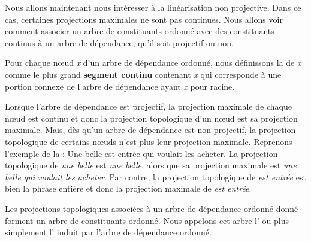 Nous allons maintenant nous intéresser à la linéarisation non projective. Dans ce cas, certaines projections maximales ne sont pas continues. Nous allons voir comment associer un arbre de constituants ordonné avec des constituants continus à un arbre de dépendance, qu’il soit projectif ou non.

\begin{styleLivreImportant}
Pour chaque nœud \textit{x} d’un arbre de dépendance ordonné, nous définissons la  de \textit{x} comme le plus grand \textbf{segment continu} contenant \textit{x} qui corresponde à une portion connexe de l’arbre de dépendance ayant \textit{x} pour racine.
\end{styleLivreImportant}

Lorsque l’arbre de dépendance est projectif, la projection maximale de chaque nœud est continu et donc la projection topologique d’un nœud est sa projection maximale. Mais, dès qu’un arbre de dépendance est non projectif, la projection topologique de certains nœuds n’est plus leur projection maximale. Reprenons l’exemple de la  :
\ea
    {Une belle est entrée qui voulait les acheter}.
\z
La projection topologique de \textit{une belle} est \textit{une belle}, alors que sa projection maximale est \textit{une belle qui voulait les acheter}. Par contre, la projection topologique de \textit{est entrée} est bien la phrase entière et donc la projection maximale de \textit{est entrée}.

Les projections topologiques associées à un arbre de dépendance ordonné donné forment un arbre de constituants ordonné. Nous appelons cet arbre l’ ou plus simplement l’ induit par l’arbre de dépendance ordonné.

